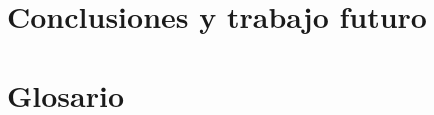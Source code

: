 \documentclass[11pt,a4paper,titlepage,twoside,openright]{report}
\begin{document}
\chapter{Conclusiones y trabajo futuro}
        
        

\listoftables
\cleardoublepage

\listoffigures
\cleardoublepage

\appendix
{}

\chapter{Glosario}
		\label{glosario}
		
		\cleardoublepage

\cleardoublepage




\end{document}
